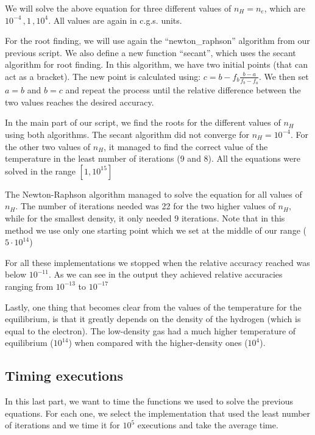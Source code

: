 \documentclass[a4paper,10pt]{article}
\begin{document}
We will solve the above equation for three different values of $n_H=n_e$, which are $10^{-4}\, ,1\, , 10^4$. All values are again in c.g.s. units. 

For the root finding, we will use again the ``newton\_raphson'' algorithm from our previous script. We also define a new function ``secant'', which uses the secant algorithm for root finding. In this algorithm, we have two initial points (that can act as a bracket). The new point is calculated using: $c=b-f_b\frac{b-a}{f_b-f_a}$. We then set $a=b$ and $b=c$ and repeat the process until the relative difference between the two values reaches the desired accuracy. 



In the main part of our script, we find the roots for the different values of $n_H$ using both algorithms. The secant algorithm did not converge for $n_H=10^{-4}$. For the other two values of $n_H$, it managed to find the correct value of the temperature in the least number of iterations (9 and 8). All the equations were solved in the range $[1,10^{15}]$ 

The Newton-Raphson algorithm managed to solve the equation for all values of $n_H$. The number of iterations needed was 22 for the two higher values of $n_H$, while for the smallest density, it only needed 9 iterations. Note that in this method we use only one starting point which we set at the middle of our range ($5 \cdot 10^{14}$) 

For all these implementations we stopped when the relative accuracy reached was below $10^{-11}$. As we can see in the output they achieved relative accuracies ranging from $10^{-13}$ to $10^{-17}$



Lastly, one thing that becomes clear from the values of the temperature for the equilibrium, is that it greatly depends on the density of the hydrogen (which is equal to the electron). The low-density gas had a much higher temperature of equilibrium ($10^{14}$) when compared with the higher-density ones ($10^{4}$).

\subsection{Timing executions}

In this last part, we want to time the functions we used to solve the previous equations. For each one, we select the implementation that used the least number of iterations and we time it for $10^5$ executions and take the average time. 
\end{document}
